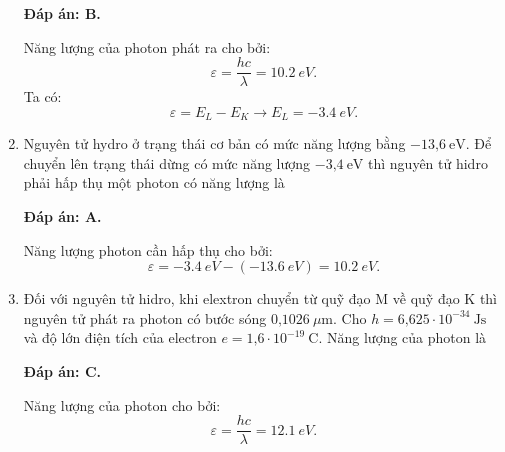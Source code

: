 \begin{enumerate}[label=\bfseries Câu \arabic*:]
	\loigiai
	{		\textbf{Đáp án: B.}
		
Năng lượng của photon phát ra cho bởi:
$$
	\varepsilon = \dfrac{hc}{\lambda} = \SI{10,2}{eV}.
$$
Ta có:
$$
	\varepsilon = E_{L} - E_{K} \rightarrow E_{L} = \SI{-3,4}{eV}.
$$
	}
	
	\item {} 
		\cauhoi
	{Nguyên tử hydro ở trạng thái cơ bản có mức năng lượng bằng $-\text{13,6}\ \text{eV}.$ Để chuyển lên trạng thái dừng có mức năng lượng $-\text{3,4}\ \text{eV}$ thì nguyên tử hidro phải hấp thụ một photon có năng lượng là 
	}
	
	\loigiai
	{		\textbf{Đáp án: A.}
		
Năng lượng photon cần hấp thụ cho bởi:
$$
	\varepsilon = \SI{-3,4}{eV} - ( \SI{-13,6}{eV} ) = \SI{10,2}{eV}.
$$
		
	}
	
	\item {} 
		\cauhoi
	{Đối với nguyên tử hidro, khi elextron chuyển từ quỹ đạo M về quỹ đạo K thì nguyên tử phát ra photon có bước sóng $\text{0,1026}\ \mu\text{m}$. Cho $h=\text{6,625}\cdot 10^{-34}\ \text{Js}$ và độ lớn điện tích của electron $e=\text{1,6}\cdot 10^{-19}\ \text{C}$. Năng lượng của photon là
	}
	
	\loigiai
	{		\textbf{Đáp án: C.}
		
Năng lượng của photon cho bởi:
$$
	\varepsilon = \dfrac{hc}{\lambda} = \SI{12,1}{eV}.
$$
		
	}
	

\end{enumerate}
